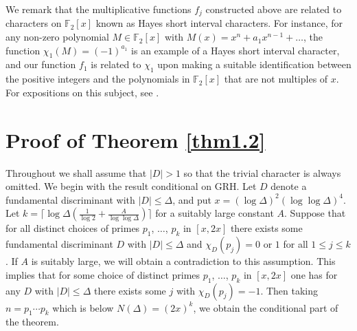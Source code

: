 \documentclass[11pt,makeidx, reqno]{amsart}
\theoremstyle{mystyle}
\theoremstyle{definition}
\begin{document}
We remark that the multiplicative functions $f_j$ constructed above are related to characters on ${\mathbb F}_2[x]$ known as Hayes short interval characters.   For instance, for any non-zero polynomial $M \in {\mathbb F}_2[x]$ with $M(x) = x^n + a_1 x^{n-1} +\ldots$, the function $\chi_1(M) = (-1)^{a_1}$ is an example of a Hayes short interval character, and our function $f_1$ is related to $\chi_1$ upon making a suitable identification between the positive integers and the polynomials in ${\mathbb F}_2[x]$ that are not multiples of $x$.  For expositions on this subject, see \cite{gorodetskyCorrelation,hayesDistribution}.
 









































\section{Proof of Theorem \ref{thm1.2}}


\noindent Throughout we shall assume that $|D|>1$ so that the trivial character is always omitted.  We begin with the result conditional on GRH.   Let $D$ denote a fundamental discriminant with $|D|\le \Delta$, and put $x=(\log \Delta)^2 (\log \log \Delta)^4$.   Let $k=\lceil \log \Delta( \frac{1}{\log 2} + \frac{A}{\log \log \Delta}) \rceil$ for a suitably large constant $A$.  Suppose that for all distinct choices of primes $p_1$, $\ldots$, $p_k$ in $[x,2x]$ there exists some fundamental discriminant $D$ with $|D|\le \Delta$ and $\chi_D(p_j)=0$ or $1$ for all $1\le j\le k$.   If $A$ is suitably large, we will obtain a contradiction to this assumption.  This implies that for some choice of distinct primes $p_1$, $\ldots$, $p_k$ in $[x,2x]$ one has for any $D$ with $|D|\le \Delta$ there exists some $j$ with $\chi_D(p_j)=-1$.   Then taking $n=p_1 \cdots p_k$ which is below $N(\Delta) = (2x)^k$,  we obtain the conditional part of the theorem.   
\end{document}
